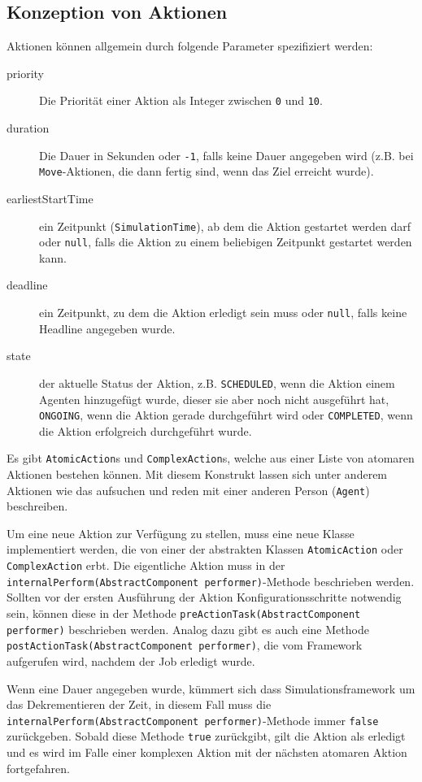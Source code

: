 \subsection{Konzeption von Aktionen}\label{subsec:concept_actions}
Aktionen können allgemein durch folgende Parameter spezifiziert werden:
\begin{description}
	\item[priority] Die Priorität einer Aktion als Integer zwischen \texttt{0} und \texttt{10}.
	\item[duration] Die Dauer in Sekunden oder \texttt{-1}, falls keine Dauer angegeben wird (z.B. bei \texttt{Move}-Aktionen, die dann fertig sind, wenn das Ziel erreicht wurde).
	\item[earliestStartTime] ein Zeitpunkt (\texttt{SimulationTime}), ab dem die Aktion gestartet werden darf oder \texttt{null}, falls die Aktion zu einem beliebigen Zeitpunkt gestartet werden kann.
	\item[deadline] ein Zeitpunkt, zu dem die Aktion erledigt sein muss oder \texttt{null}, falls keine Headline angegeben wurde.
	\item[state] der aktuelle Status der Aktion, z.B. \texttt{SCHEDULED}, wenn die Aktion einem Agenten hinzugefügt wurde, dieser sie aber noch nicht ausgeführt hat, \texttt{ONGOING}, wenn die Aktion gerade durchgeführt wird oder \texttt{COMPLETED}, wenn die Aktion erfolgreich durchgeführt wurde.
\end{description}
Es gibt \texttt{AtomicAction}s und \texttt{ComplexAction}s, welche aus einer Liste von atomaren Aktionen bestehen können. Mit diesem Konstrukt lassen sich unter anderem Aktionen wie das aufsuchen und reden mit einer anderen Person (\texttt{Agent}) beschreiben.

Um eine neue Aktion zur Verfügung zu stellen, muss eine neue Klasse implementiert werden, die von einer der abstrakten Klassen \texttt{AtomicAction} oder \texttt{ComplexAction} erbt. Die eigentliche Aktion muss in der \texttt{internalPerform(AbstractComponent performer)}-Methode beschrieben werden. Sollten vor der ersten Ausführung der Aktion Konfigurationsschritte notwendig sein, können diese in der Methode \texttt{preActionTask(AbstractComponent performer)} beschrieben werden. Analog dazu gibt es auch eine Methode \texttt{postActionTask(AbstractComponent performer)}, die vom Framework aufgerufen wird, nachdem der Job erledigt wurde.

Wenn eine Dauer angegeben wurde, kümmert sich dass Simulationsframework um das Dekrementieren der Zeit, in diesem Fall muss die \texttt{internalPerform(AbstractComponent performer)}-Methode immer \texttt{false} zurückgeben. Sobald diese Methode \texttt{true} zurückgibt, gilt die Aktion als erledigt und es wird im Falle einer komplexen Aktion mit der nächsten atomaren Aktion fortgefahren.

